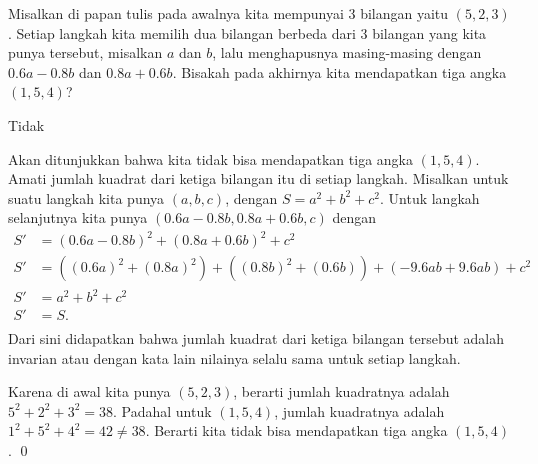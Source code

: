 \documentclass[11pt]{scrartcl}
\begin{document}
	\begin{soalbaru}
		Misalkan di papan tulis pada awalnya kita mempunyai 3 bilangan yaitu $(5,2,3)$. Setiap langkah kita memilih dua bilangan berbeda dari 3 bilangan yang kita punya tersebut, misalkan $a$ dan $b$, lalu menghapusnya  masing-masing dengan $0.6a-0.8b$ dan $0.8a+0.6b$. Bisakah pada akhirnya kita mendapatkan tiga angka $(1,5,4)$?
		\begin{jawaban}
		Tidak
		\end{jawaban}
		\begin{solusi}
		Akan ditunjukkan bahwa kita tidak bisa mendapatkan tiga angka $(1,5,4)$.
		Amati jumlah kuadrat dari ketiga bilangan itu di setiap langkah. Misalkan untuk suatu langkah kita punya $(a,b,c)$, dengan $S=a^2+b^2+c^2$. Untuk langkah selanjutnya kita punya $(0.6a-0.8b,0.8a+0.6b,c)$ dengan 
		\vspace{-8pt}
		\begin{equation*}
		\begin{split}
		S' &= (0.6a-0.8b)^2+(0.8a+0.6b)^2+c^2\\
		S' &= ((0.6a)^2+(0.8a)^2)+((0.8b)^2+(0.6b))+(-9.6ab+9.6ab)+c^2\\
		S' &= a^2+b^2+c^2\\
		S' &= S.\\[-8pt]
		\end{split}
		\end{equation*}
		 Dari sini didapatkan bahwa jumlah kuadrat dari ketiga bilangan tersebut adalah invarian atau dengan kata lain nilainya selalu sama untuk setiap langkah. 
		
		Karena di awal kita punya $(5,2,3)$, berarti jumlah kuadratnya adalah $5^2+2^2+3^2=38$. Padahal untuk $(1,5,4)$, jumlah kuadratnya adalah $1^2+5^2+4^2=42 \neq 38$. Berarti kita tidak bisa mendapatkan tiga angka $(1,5,4)$. \qed
		\end{solusi}
	\end{soalbaru}
	
\end{document}
